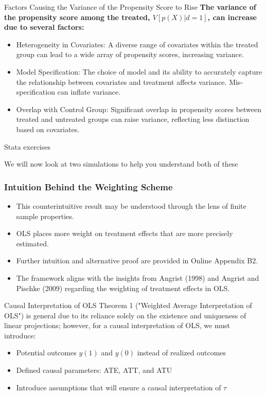 \documentclass{beamer}
\begin{document}
\begin{frame}{Factors Causing the Variance of the Propensity Score to Rise}
\textbf{The variance of the propensity score among the treated, \( V[p(X) | d = 1] \), can increase due to several factors:}

\begin{itemize}
  \item \alert{Heterogeneity in Covariates:} A diverse range of covariates within the treated group can lead to a wide array of propensity scores, increasing variance.
  \item \alert{Model Specification:} The choice of model and its ability to accurately capture the relationship between covariates and treatment affects variance. Mis-specification can inflate variance.
  \item \alert{Overlap with Control Group:} Significant overlap in propensity scores between treated and untreated groups can raise variance, reflecting less distinction based on covariates.
\end{itemize}

\end{frame}


\begin{frame}{Stata exercises}

We will now look at two simulations to help you understand both of these

\end{frame}



\begin{frame}
\frametitle{Intuition Behind the Weighting Scheme}
\begin{itemize}
    \item This counterintuitive result may be understood through the lens of finite sample properties.
    \item OLS places more weight on treatment effects that are more precisely estimated.
    \item Further intuition and alternative proof are provided in Online Appendix B2.
    \item The framework aligns with the insights from Angrist (1998) and Angrist and Pischke (2009) regarding the weighting of treatment effects in OLS.
\end{itemize}
\end{frame}

\begin{frame}{Causal Interpretation of OLS}
  Theorem 1 ("Weighted Average Interpretation of OLS") is general due to its reliance solely on the existence and uniqueness of linear projections; however, for a causal interpretation of OLS, we must introduce:
  \begin{itemize}
    \item Potential outcomes \( y(1) \) and \( y(0) \) instead of realized outcomes
    \item Defined causal parameters: ATE, ATT, and ATU
    \item Introduce assumptions that will ensure a causal interpretation of \( \tau \)
  \end{itemize}
\end{frame}
\end{document}
